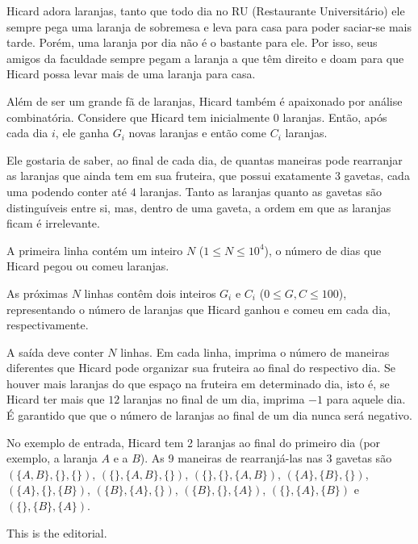 Hicard adora laranjas, tanto que todo dia no RU (Restaurante Universitário) ele sempre pega uma laranja de sobremesa e leva para casa para poder saciar-se mais tarde.  
Porém, uma laranja por dia não é o bastante para ele. Por isso, seus amigos da faculdade sempre pegam a laranja a que têm direito e doam para que Hicard possa levar mais de uma laranja para casa.

Além de ser um grande fã de laranjas, Hicard também é apaixonado por análise combinatória.
Considere que Hicard tem inicialmente $0$ laranjas. Então, após cada dia $i$, ele ganha $G_i$ novas laranjas e então come $C_i$ laranjas.

Ele gostaria de saber, ao final de cada dia, de quantas maneiras pode rearranjar as laranjas que ainda tem em sua fruteira, que possui exatamente $3$ gavetas, cada uma podendo conter até $4$ laranjas. Tanto as laranjas quanto as gavetas são distinguíveis entre si, mas, dentro de uma gaveta, a ordem em que as laranjas ficam é irrelevante.


A primeira linha contém um inteiro $N$ ($1 \le N \le 10^4$), o número de dias que Hicard pegou ou comeu laranjas.

As próximas $N$ linhas contêm dois inteiros $G_i$ e $C_i$ ($0 \le G, C \le 100$), representando o número de laranjas que Hicard ganhou e comeu em cada dia, respectivamente.


A saída deve conter $N$ linhas.  
Em cada linha, imprima o número de maneiras diferentes que Hicard pode organizar sua fruteira ao final do respectivo dia.
Se houver mais laranjas do que espaço na fruteira em determinado dia, isto é, se Hicard ter mais que $12$ laranjas no final de um dia, imprima $-1$ para aquele dia.
É garantido que que o número de laranjas ao final de um dia nunca será negativo.

No exemplo de entrada, Hicard tem 2 laranjas ao final do primeiro dia (por exemplo, a laranja $A$ e a $B$). As 9 maneiras de rearranjá-las nas 3 gavetas são
$(\{A,B\},\{\},\{\})$, $(\{\},\{A,B\},\{\})$, $(\{\},\{\},\{A,B\})$,
$(\{A\},\{B\},\{\})$, $(\{A\},\{\},\{B\})$, $(\{B\},\{A\},\{\})$,
$(\{B\},\{\},\{A\})$, $(\{\},\{A\},\{B\})$ e $(\{\},\{B\},\{A\})$.

This is the editorial.
